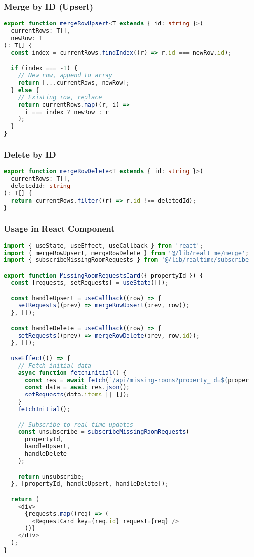 \documentclass[11pt,a4paper]{article}
\begin{document}
\subsubsection{Merge by ID (Upsert)}

\begin{lstlisting}[language=TypeScript, caption=Upsert Helper]
export function mergeRowUpsert<T extends { id: string }>(
  currentRows: T[],
  newRow: T
): T[] {
  const index = currentRows.findIndex((r) => r.id === newRow.id);

  if (index === -1) {
    // New row, append to array
    return [...currentRows, newRow];
  } else {
    // Existing row, replace
    return currentRows.map((r, i) =>
      i === index ? newRow : r
    );
  }
}
\end{lstlisting}

\subsubsection{Delete by ID}

\begin{lstlisting}[language=TypeScript, caption=Delete Helper]
export function mergeRowDelete<T extends { id: string }>(
  currentRows: T[],
  deletedId: string
): T[] {
  return currentRows.filter((r) => r.id !== deletedId);
}
\end{lstlisting}

\subsubsection{Usage in React Component}

\begin{lstlisting}[language=TypeScript, caption=React State Integration]
import { useState, useEffect, useCallback } from 'react';
import { mergeRowUpsert, mergeRowDelete } from '@/lib/realtime/merge';
import { subscribeMissingRoomRequests } from '@/lib/realtime/subscribe';

export function MissingRoomRequestsCard({ propertyId }) {
  const [requests, setRequests] = useState([]);

  const handleUpsert = useCallback((row) => {
    setRequests((prev) => mergeRowUpsert(prev, row));
  }, []);

  const handleDelete = useCallback((row) => {
    setRequests((prev) => mergeRowDelete(prev, row.id));
  }, []);

  useEffect(() => {
    // Fetch initial data
    async function fetchInitial() {
      const res = await fetch(`/api/missing-rooms?property_id=${propertyId}`);
      const data = await res.json();
      setRequests(data.items || []);
    }
    fetchInitial();

    // Subscribe to real-time updates
    const unsubscribe = subscribeMissingRoomRequests(
      propertyId,
      handleUpsert,
      handleDelete
    );

    return unsubscribe;
  }, [propertyId, handleUpsert, handleDelete]);

  return (
    <div>
      {requests.map((req) => (
        <RequestCard key={req.id} request={req} />
      ))}
    </div>
  );
}
\end{lstlisting}
\end{document}
